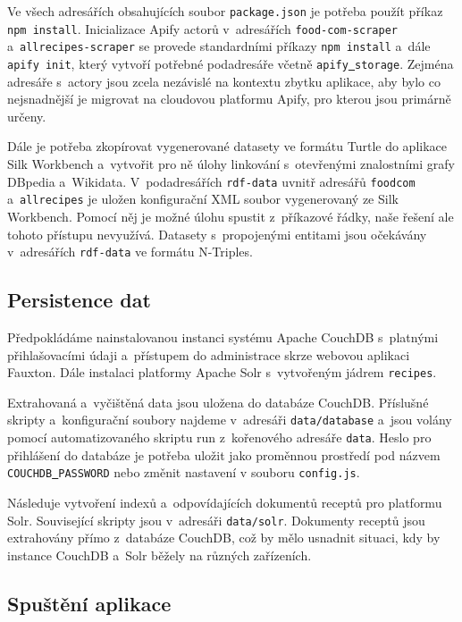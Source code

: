 \documentclass[12pt,a4paper]{report}
\begin{document}
Ve všech adresářích obsahujících soubor \texttt{package.json} je potřeba použít příkaz \texttt{npm\,install}. Inicializace Apify actorů v~adresářích \texttt{food-com-scraper} a~\texttt{allrecipes-scraper} se provede standardními příkazy \texttt{npm\,install} a~dále \texttt{apify\,init}, který vytvoří potřebné podadresáře včetně \texttt{apify\underline{{ }}storage}. Zejména adresáře s~actory jsou zcela nezávislé na kontextu zbytku aplikace, aby bylo co nejsnadnější je migrovat na cloudovou platformu Apify, pro kterou jsou primárně určeny.

Dále je potřeba zkopírovat vygenerované datasety ve formátu Turtle do aplikace Silk Workbench a~vytvořit pro ně úlohy linkování s~otevřenými znalostními grafy DBpedia a~Wikidata. V~podadresářích \texttt{rdf-data} uvnitř adresářů \texttt{foodcom} a~\texttt{allrecipes} je uložen konfigurační XML soubor vygenerovaný ze Silk Workbench. Pomocí něj je možné úlohu spustit z~příkazové řádky, naše řešení ale tohoto přístupu nevyužívá. Datasety s~propojenými entitami jsou očekávány v~adresářích \texttt{rdf-data} ve formátu N-Triples.

\subsection{Persistence dat}

Předpokládáme nainstalovanou instanci systému Apache CouchDB s~platnými přihlašovacími údaji a~přístupem do administrace skrze webovou aplikaci Fauxton. Dále instalaci platformy Apache Solr s~vytvořeným jádrem \texttt{recipes}.

Extrahovaná a~vyčištěná data jsou uložena do databáze CouchDB. Příslušné skripty a~konfigurační soubory najdeme v~adresáři \texttt{data/database} a~jsou volány pomocí automatizovaného skriptu run z~kořenového adresáře \texttt{data}. Heslo pro přihlášení do databáze je potřeba uložit jako proměnnou prostředí pod názvem \texttt{COUCHDB\underline{{ }}PASSWORD} nebo změnit nastavení v souboru \texttt{config.js}.

Následuje vytvoření indexů a~odpovídajících dokumentů receptů pro platformu Solr. Související skripty jsou v~adresáři \texttt{data/solr}. Dokumenty receptů jsou extrahovány přímo z~databáze CouchDB, což by mělo usnadnit situaci, kdy by instance CouchDB a~Solr běžely na různých zařízeních.

\subsection{Spuštění aplikace}
\end{document}
